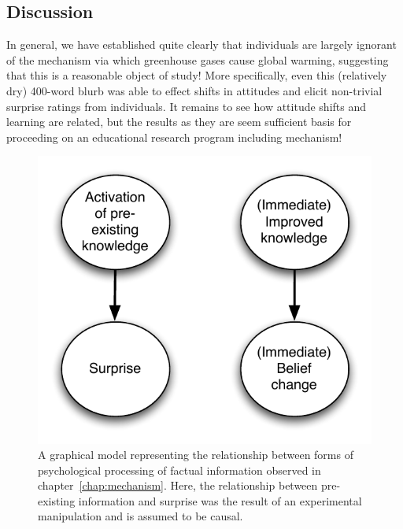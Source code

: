 \subsection{Discussion}

In general, we have established quite clearly that individuals are largely
ignorant of the mechanism via which greenhouse gases cause global warming,
suggesting that this is a reasonable object of study! More specifically, even
this (relatively dry) 400-word blurb was able to effect shifts in attitudes and
elicit non-trivial surprise ratings from individuals. It remains to see how
attitude shifts and learning are related, but the results as they are seem
sufficient basis for proceeding on an educational research program including
mechanism!



\begin{figure}
    \begin{center}
        \includegraphics{causal2.pdf}
    \end{center}
    \caption{A graphical model representing the relationship between forms of
        psychological processing of factual information observed in
        chapter~\ref{chap:mechanism}. Here, the relationship between pre-existing
        information and surprise was the result of an experimental manipulation and
        is assumed to be causal.}
    \label{fig:causal-mechanism}
\end{figure}

